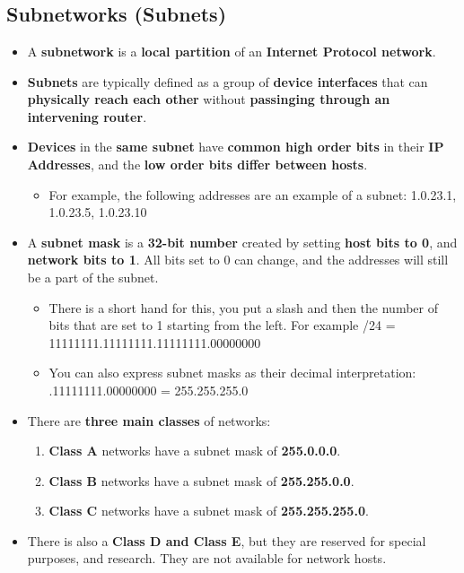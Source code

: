 \documentclass{article}
\begin{document}
    \section*{}

    \subsection*{Subnetworks (Subnets)}
    \begin{itemize}
        \item A \textbf{subnetwork} is a \textbf{local partition} of an \textbf{Internet Protocol network}.
        \item \textbf{Subnets} are typically defined as a group of \textbf{device interfaces} that can \textbf{physically reach each other} without \textbf{passinging through an intervening router}.
        \item \textbf{Devices} in the \textbf{same subnet} have \textbf{common high order bits} in their \textbf{IP Addresses}, and the \textbf{low order bits differ between hosts}.
        \begin{itemize}
            \item For example, the following addresses are an example of a subnet: 1.0.23.1, 1.0.23.5, 1.0.23.10
        \end{itemize}
        \item A \textbf{subnet mask} is a \textbf{32-bit number} created by setting \textbf{host bits to 0}, and \textbf{network bits to 1}. All bits set to 0 can change, and the addresses will still be a part of the subnet.
        \begin{itemize}
            \item There is a short hand for this, you put a slash and then the number of bits that are set to 1 starting from the left. For example /24 = 11111111.11111111.11111111.00000000
            \item You can also express subnet masks as their decimal interpretation: .11111111.00000000 = 255.255.255.0
        \end{itemize}
        \item There are \textbf{three main classes} of networks:
        \begin{enumerate}
            \item \textbf{Class A} networks have a subnet mask of \textbf{255.0.0.0}.
            \item \textbf{Class B} networks have a subnet mask of \textbf{255.255.0.0}.
            \item \textbf{Class C} networks have a subnet mask of \textbf{255.255.255.0}.
        \end{enumerate}
        \item There is also a \textbf{Class D and Class E}, but they are reserved for special purposes, and research. They are not available for network hosts.
    \end{itemize}
\end{document}
